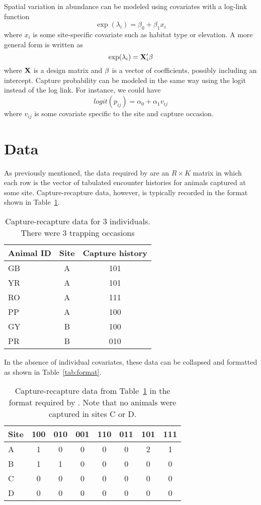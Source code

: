 \documentclass[a4paper]{article}
\begin{document}
Spatial variation in abundance can be modeled using covariates
with a log-link function
\[
\exp(\lambda_i) = \beta_0 + \beta_1 x_i
\]
where $x_i$ is some site-specific covariate such as habitat type or
elevation. A more general form is written as
\[
\exp(\lambda_i) = {\bold X_i' \beta}
\]
where ${\bold X}$ is a design matrix and ${\bold \beta}$ is a vector
of coefficients, possibly including an intercept.
Capture probability can be modeled in the same way using the logit
instead of the log link. For instance, we could have
\[
logit(p_{ij}) = \alpha_0 + \alpha_1 v_{ij}
\]
where $v_{ij}$ is some covariate specific to the site and
capture occasion.


\section{Data}
As previously mentioned, the data required by  are an $R \times K$
matrix in which each row is the vector of tabulated encounter
histories for animals captured at some site. Capture-recapture data,
however, is typically recorded in the format shown in
Table~\ref{tab:raw}.

\begin{table}[h]
  \centering
  \caption{Capture-recapture data for 3 individuals. There were 3
    trapping occasions}
  \begin{tabular}{lcc}
    \hline
    Animal ID   & Site  & Capture history \\
    \hline
    GB        & A     & 101 \\
    YR        & A     & 101 \\
    RO        & A     & 111 \\
    PP        & A     & 100 \\
    GY        & B     & 100 \\
    PR        & B     & 010 \\
    \hline
  \end{tabular}
  \label{tab:raw}
\end{table}

In the absence of individual covariates, these data can be collapsed
and formatted as shown in Table~\ref{tab:format}.

\begin{table}[h]
  \centering
  \caption{Capture-recapture data from Table~\ref{tab:raw} in the
    format required by . Note that no animals were
    captured in sites C or D.}
  \begin{tabular}{lccccccc}
    \hline
    Site  & 100 & 010 & 001 & 110 & 011 & 101 & 111 \\
    \hline
    A     & 1   & 0   & 0   & 0   & 0   & 2   & 1   \\
    B     & 1   & 1   & 0   & 0   & 0   & 0   & 0   \\
    C     & 0   & 0   & 0   & 0   & 0   & 0   & 0   \\
    D     & 0   & 0   & 0   & 0   & 0   & 0   & 0   \\
    \hline
  \end{tabular}
\end{table}
\end{document}
